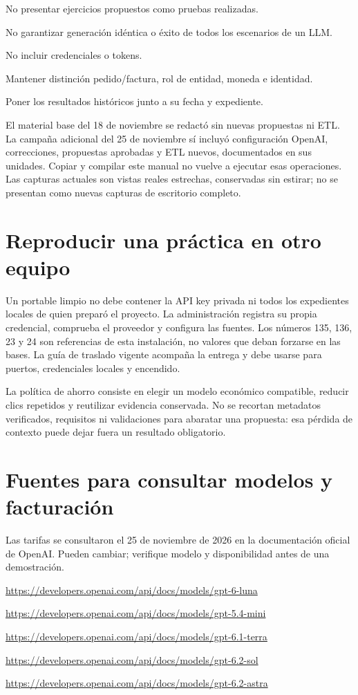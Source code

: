 No presentar ejercicios propuestos como pruebas realizadas.

No garantizar generación idéntica o éxito de todos los escenarios de un LLM.

No incluir credenciales o tokens.

Mantener distinción pedido/factura, rol de entidad, moneda e identidad.

Poner los resultados históricos junto a su fecha y expediente.

El material base del 18 de noviembre se redactó sin nuevas propuestas ni ETL. La campaña adicional del 25 de noviembre sí incluyó configuración OpenAI, correcciones, propuestas aprobadas y ETL nuevos, documentados en sus unidades. Copiar y compilar este manual no vuelve a ejecutar esas operaciones. Las capturas actuales son vistas reales estrechas, conservadas sin estirar; no se presentan como nuevas capturas de escritorio completo.

\section{Reproducir una práctica en otro equipo}
Un portable limpio no debe contener la API key privada ni todos los expedientes locales de quien preparó el proyecto. La administración registra su propia credencial, comprueba el proveedor y configura las fuentes. Los números 135, 136, 23 y 24 son referencias de esta instalación, no valores que deban forzarse en las bases. La guía de traslado vigente acompaña la entrega y debe usarse para puertos, credenciales locales y encendido.

La política de ahorro consiste en elegir un modelo económico compatible, reducir clics repetidos y reutilizar evidencia conservada. No se recortan metadatos verificados, requisitos ni validaciones para abaratar una propuesta: esa pérdida de contexto puede dejar fuera un resultado obligatorio.

\section{Fuentes para consultar modelos y facturación}
Las tarifas se consultaron el 25 de noviembre de 2026 en la documentación oficial de OpenAI. Pueden cambiar; verifique modelo y disponibilidad antes de una demostración.

\url{https://developers.openai.com/api/docs/models/gpt-6-luna}\par\smallskip
\url{https://developers.openai.com/api/docs/models/gpt-5.4-mini}\par\smallskip
\url{https://developers.openai.com/api/docs/models/gpt-6.1-terra}\par\smallskip
\url{https://developers.openai.com/api/docs/models/gpt-6.2-sol}\par\smallskip
\url{https://developers.openai.com/api/docs/models/gpt-6.2-astra}\par\smallskip
